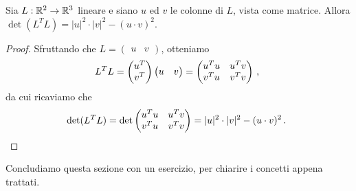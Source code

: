 \begin{lemma}
	Sia $L:\mathbb R^2\to\mathbb R^3$ lineare e siano $u$ ed $v$ le colonne di $L$, vista come matrice. Allora $\det(L^TL)=\lvert u\rvert^2\cdot\lvert v \rvert^2- (u\cdot v)^2$.
\end{lemma}
\begin{proof}
	Sfruttando che $L=\begin{pmatrix}u& v\end{pmatrix}$, otteniamo
	\begin{equation*}
		L^TL=\begin{pmatrix}u^T\\v^T\end{pmatrix}\begin{pmatrix}u&v\end{pmatrix}=\begin{pmatrix}
		                                                                         	u^Tu & u^Tv\\
		                                                                         	v^Tu & v^Tv
		                                                                         \end{pmatrix}\, \text{, }
	\end{equation*}
	da cui ricaviamo che
	\begin{equation*}
		\det(L^TL)=\det\begin{pmatrix}u^Tu & u^Tv\\v^Tu & v^Tv\end{pmatrix}=\lvert u \rvert^2\cdot \lvert v \rvert^2-(u\cdot v)^2\, \text{. }
	\end{equation*}
\end{proof}


Concludiamo questa sezione con un esercizio, per chiarire i concetti appena trattati.

